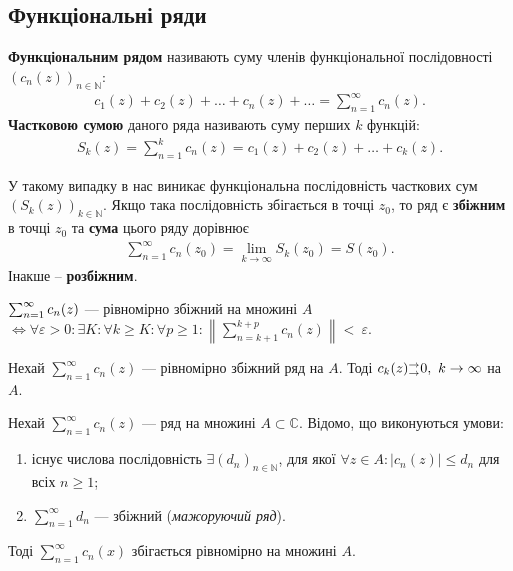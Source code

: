 \documentclass{math_library}
\begin{document}
\subsection{Функціональні ряди}
\begin{definition}
\textbf{Функціональним рядом} називають суму членів функціональної послідовності $(c_n(z))_{n \in \mathbb{N}}$:
\begin{align*}
c_1(z) + c_2(z) + \dots + c_n(z) + \dots = \sum_{n=1}^\infty c_n(z).
\end{align*}
\textbf{Частковою сумою} даного ряда називають суму перших $k$ функцій:
\begin{align*}
S_k(z) = \sum_{n=1}^k c_n(z) = c_1(z) + c_2(z) + \dots + c_k(z).
\end{align*}
\end{definition}

У такому випадку в нас виникає функціональна послідовність часткових сум $(S_k(z))_{k \in \mathbb{N}}$. Якщо така послідовність збігається в точці $z_0$, то ряд є \textbf{збіжним} в точці $z_0$ та \textbf{сума} цього ряду дорівнює
\begin{align*}
\sum_{n=1}^\infty c_n(z_0) = \lim_{k \to \infty} S_k(z_0) = S(z_0).
\end{align*}
Інакше -- \textbf{розбіжним}.

\begin{theorem}
$\huge \sum_{n=1}^\infty c_n(z)$ --- рівномірно збіжний на множині $A$ $\iff \forall \varepsilon > 0: \exists K: \forall k \geq K: \forall p \geq 1: \displaystyle\left\| \sum_{n=k+1}^{k+p} c_n(z)  \right\| < ~{\varepsilon}$.
\end{theorem}

\begin{corollary}
Нехай $\displaystyle\sum_{n=1}^\infty c_n(z)$ --- рівномірно збіжний ряд на $A$. Тоді $c_k(z){}^\rightarrow_\rightarrow 0,\ k \to \infty$ на $A$.
\end{corollary}

\begin{theorem}
Нехай $\displaystyle \sum_{n=1}^\infty c_n(z)$ --- ряд на множині $A \subset \mathbb{C}$. Відомо, що виконуються умови:
\begin{enumerate}[nosep,wide=0pt,label={\arabic*)}]
\item існує числова послідовність $\exists (d_n)_{n \in \mathbb{N}}$, для якої $\forall z \in A: |c_n(z)| \leq d_n$ для всіх $n \geq 1$;
\item $\displaystyle \sum_{n=1}^\infty d_n$ --- збіжний (\textit{мажоруючий ряд}).
\end{enumerate}
Тоді $\displaystyle \sum_{n=1}^\infty c_n(x)$ збігається рівномірно на множині $A$.
\end{theorem}
\end{document}
